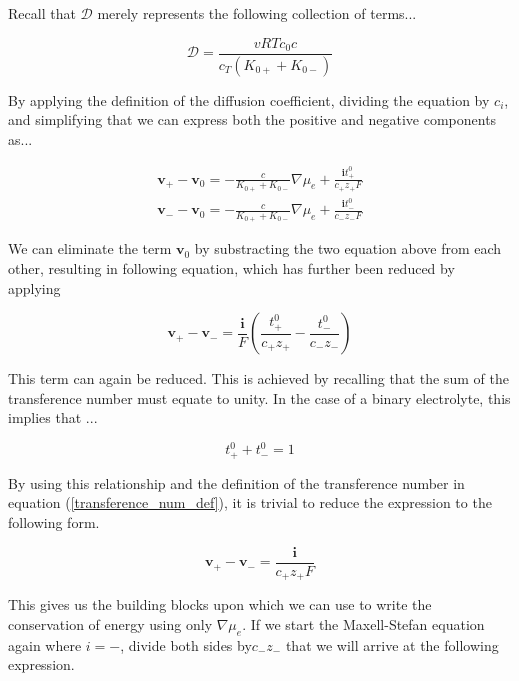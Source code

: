 \documentclass[lettersize,journal]{IEEEtran}
\begin{document}
\noindent Recall that $\mathscr{D}$ merely represents the following collection of terms...

\begin{equation}
\mathscr{D}=\frac{v R T c_{0} c}{c_{T}\left(K_{0+}+K_{0-}\right)}
\end{equation}

\noindent By applying the definition of the diffusion coefficient, dividing the equation by $c_i$, and simplifying that we can express both the positive and negative components as...

\begin{equation}\label{rel_v_pos_n_neg}
\begin{array}{l}
\mathbf{v}_{+}-\mathbf{v}_{0}=-\frac{c}{K_{0+}+K_{0-}} \nabla \mu_{e}+\frac{\mathbf{i} t_{+}^{0}}{c_{+} z_{+} F} \\
\mathbf{v}_{-}-\mathbf{v}_{0}=-\frac{c}{K_{0+}+K_{0-}} \nabla \mu_{e}+\frac{\mathbf{i} t_{-}^{0}}{c_{-} z_{-} F}
\end{array}
\end{equation}

\noindent We can eliminate the term $\mathbf{v}_0$ by substracting the two equation above from each other, resulting in following equation, which has further been reduced by applying

\begin{equation}
\mathbf{v}_{+}-\mathbf{v}_{-} =\frac{\mathbf{i}}{F}\left(\frac{t_{+}^{0}}{c_{+} z_{+}}-\frac{t_{-}^{0}}{c_{-} z_{-}}\right)
\end{equation}


\noindent This term can again be reduced. This is achieved by recalling that the sum of the transference number must equate to unity. In the case of a binary electrolyte, this implies that ...

\begin{equation}
  t_{+}^{0} + t_{-}^{0} = 1
\end{equation}

\noindent By using this relationship and the definition of the transference number in equation (\ref{transference_num_def}), it is trivial to reduce the expression to the following form.



\begin{equation}\label{rel_V}
\mathbf{v}_{+}-\mathbf{v}_{-} =\frac{\mathbf{i}}{c_{+} z_{+} F}
\end{equation}

\noindent This gives us the building blocks upon which we can use to write the conservation of energy using only $\nabla \mu_e$. If we start the Maxell-Stefan equation again where $i = -$, divide both sides by$c_{-}z_{-}$ that we will arrive at the following expression.
\end{document}
